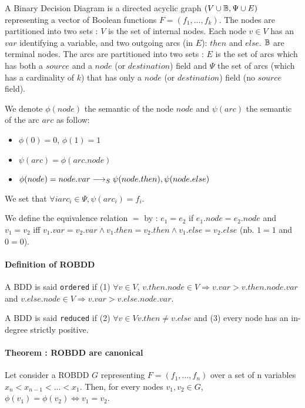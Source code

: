 \documentclass[a4paper,10pt]{article}
\begin{document}
A Binary Decision Diagram is a directed acyclic graph $(V\cup \mathbb{B}, \Psi \cup E)$ representing a vector of Boolean functions $F=(f_1, ..., f_k)$.
The nodes are partitioned into two sets : $V$ is the set of internal nodes.
Each node $v\in V$ has an $var$ identifying a variable, and two outgoing arcs (in $E$): $then$ and $else$. $\mathbb{B}$ are terminal nodes.
The arcs are partitioned into two sets : $E$ is the set of arcs which has both a $source$ and a $node$ (or $destination$) field and $\Psi$ the set of arcs (which has a cardinality of $k$) that has only a $node$ (or $destination$) field (no $source$ field).


We denote $\phi(node)$ the semantic of the node $node$ and $\psi(arc)$ the semantic of the arc $arc$ as follow:\begin{itemize}
\item $\phi(0) = 0$, $\phi(1) = 1$
\item $\psi(arc) = \phi(arc.node)$
\item $\phi(node) = node.var \longrightarrow_S \psi(node.then), \psi(node.else)$
\end{itemize}

We set that $\forall i arc_i \in \Psi, \psi(arc_i) = f_i$.

We define the equivalence relation $=$ by : $e_1 = e_2$ if $e_1.node = e_2.node$ and $v_1 = v_2$ iff $v_1.var = v_2.var \land v_1.then = v_2.then \land v_1.else = v_2.else$ (nb. $1=1$ and $0=0$).

\paragraph{Definition of ROBDD\\}
A BDD is said \texttt{ordered} if (1) $\forall v\in V$, $v.then.node \in V \Rightarrow v.var > v.then.node.var$ and $v.else.node \in V \Rightarrow v.var > v.else.node.var$.

A BDD is said \texttt{reduced} if (2) $\forall v\in V v.then \neq v.else$ and (3) every node has an in-degree strictly positive.

\paragraph{Theorem : ROBDD are canonical\\}

Let consider a ROBDD $G$ representing $F=(f_1, ..., f_n)$ over a set of n variables $x_n < x_{n-1} < ... < x_1$. Then, for every nodes $v_1, v_2 \in G$, $\phi(v_1) = \phi(v_2) \Leftrightarrow v_1 = v_2$.
\end{document}
